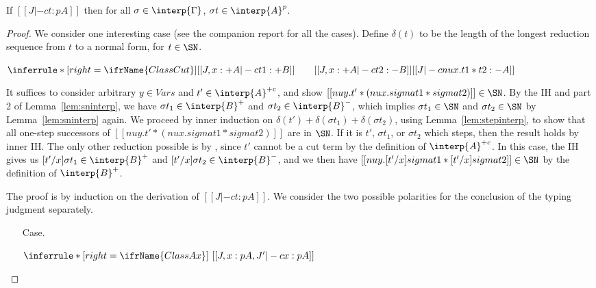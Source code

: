 \begin{thm}[Soundness]
\label{thm:sndinterp}
If $[[ J |-c t : p A]]$ then for all $\sigma\in\interp{\Gamma}$, $\sigma t\in\interp{A}^p$.
\end{thm}
\begin{proof}
  We consider one interesting case (see the companion report for all
  the cases).  Define $\delta(t)$ to be the length of the longest
  reduction sequence from $t$ to a normal form, for $t\in\SN$.

\begin{center}
\begin{math}
\inferrule* [right=\ifrName{ClassCut}] {[[ J , x : + A  |-c t1 : + B ]]  \qquad [[  J , x : + A  |-c t2 : - B ]]}{[[  J |-c nu x . t1 * t2 : - A ]]}
\end{math}
\end{center}

It suffices to consider arbitrary $y\in\textit{Vars}$ and
$t'\in\interp{A}^{+c}$, and show $[[nu y. t' * (nu x . sigma t1 *
sigma t2)]]\in\SN$.  By the IH and part 2 of Lemma~\ref{lem:sninterp},
we have $\sigma t_1\in\interp{B}^+$ and $\sigma t_2\in\interp{B}^-$,
which implies $\sigma t_1\in\SN$ and $\sigma t_2\in\SN$ by
Lemma~\ref{lem:sninterp} again.  We proceed by inner induction on
$\delta(t')+\delta(\sigma t_1)+\delta(\sigma t_2)$, using
Lemma~\ref{lem:stepinterp}, to show that all one-step successors of
$[[nu y. t' * (nu x . sigma t1 * sigma t2)]]$ are in $\SN$.  If it is
$t'$, $\sigma t_1$, or $\sigma t_2$ which steps, then the result holds
by inner IH.  The only other reduction possible is by
, since $t'$ cannot be a cut term by the
definition of $\interp{A}^{+c}$.  In this case, the IH gives us
$[t'/x]\sigma t_1\in\interp{B}^+$ and $[t'/x]\sigma
t_2\in\interp{B}^-$, and we then have $[[nu y . [t'/x]sigma t1 *
[t'/x]sigma t2]]\in\SN$ by the definition of $\interp{B}^+$.

The proof is by induction on the derivation of $[[ J |-c t : p A]]$.  We consider
the two possible polarities for the conclusion of the typing judgment separately.

\begin{itemize}
\item[Case.]\ 

\vspace{-.2cm}
\begin{center}
\begin{math}
\inferrule* [right=\ifrName{ClassAx}] {\ }{[[J , x : p A , J' |-c x : p A]]}
\end{math}
\end{center}


\end{itemize}
\end{proof}
